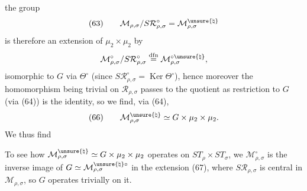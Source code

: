 the group
\[
(63)\qquad
\mathcal M_{\rho,\sigma}/S\mathcal R_{\rho,\sigma}^{\circ}
=\mathcal M_{\rho,\sigma}^{\unsure{\natural}}
\]
is therefore an extension of $\mu_2\times\mu_2$ by
\[
\mathcal M_{\rho,\sigma}^{\circ}/S\mathcal R_{\rho,\sigma}^{\circ}
\overset{\mathrm{dfn}}{=}
\mathcal M_{\rho,\sigma}^{\circ\unsure{\natural}},
\]
isomorphic to $G$ via $\Theta^\circ$
(since $S\mathcal R_{\rho,\sigma}^{\circ}=\operatorname{Ker}\Theta^\circ$), hence
moreover the homomorphism
being trivial on $\mathcal R_{\rho,\sigma}$ passes to the quotient as
 restriction to $G$ (via (64)) is the identity,
so we find, via (64),
\[
(66)\qquad
\mathcal M_{\rho,\sigma}^{\unsure{\natural}}\simeq
G\times\mu_2\times\mu_2.
\]
We thus find

To see how
$\mathcal M_{\rho,\sigma}^{\unsure{\natural}}\simeq G\times\mu_2\times\mu_2$
operates on $ST_\rho\times ST_\sigma$, we
$\mathcal M_{\rho,\sigma}^{\circ}$ is the inverse image of
$G\simeq\mathcal M_{\rho,\sigma}^{\unsure{\natural}\circ}$
in the extension (67), where $S\mathcal R_{\rho,\sigma}$ is central
in $\mathcal M_{\rho,\sigma}$, so $G$ operates trivially on it.

